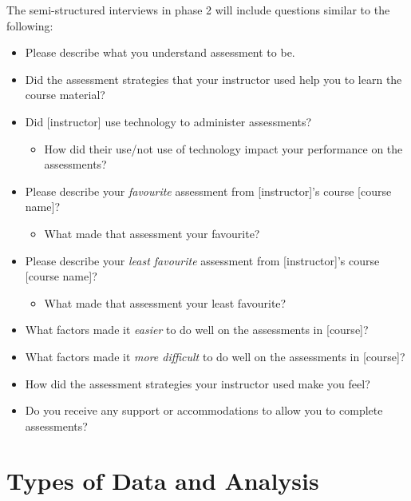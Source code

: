 \documentclass[
]{book}
\providecommand{\tightlist}{%
  \setlength{\itemsep}{0pt}\setlength{\parskip}{0pt}}
\begin{document}
The semi-structured interviews in phase 2 will include questions similar to the following:

\begin{itemize}
\tightlist
\item
  Please describe what you understand assessment to be.
\item
  Did the assessment strategies that your instructor used help you to learn the course material?
\item
  Did {[}instructor{]} use technology to administer assessments?

  \begin{itemize}
  \tightlist
  \item
    How did their use/not use of technology impact your performance on the assessments?
  \end{itemize}
\item
  Please describe your \emph{favourite} assessment from {[}instructor{]}'s course {[}course name{]}?

  \begin{itemize}
  \tightlist
  \item
    What made that assessment your favourite?
  \end{itemize}
\item
  Please describe your \emph{least favourite} assessment from {[}instructor{]}'s course {[}course name{]}?

  \begin{itemize}
  \tightlist
  \item
    What made that assessment your least favourite?
  \end{itemize}
\item
  What factors made it \emph{easier} to do well on the assessments in {[}course{]}?
\item
  What factors made it \emph{more difficult} to do well on the assessments in {[}course{]}?
\item
  How did the assessment strategies your instructor used make you feel?
\item
  Do you receive any support or accommodations to allow you to complete assessments?
\end{itemize}

\hypertarget{types-of-data-and-analysis}{%
\section{Types of Data and Analysis}\label{types-of-data-and-analysis}}
\end{document}
